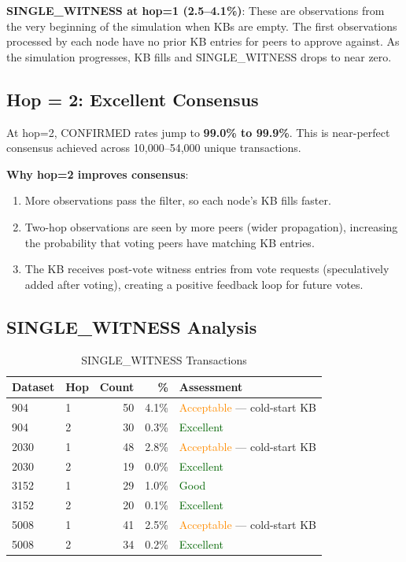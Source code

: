 \documentclass[11pt,a4paper]{article}
\begin{document}
\textbf{SINGLE\_WITNESS at hop=1 (2.5--4.1\%)}: These are observations from the
very beginning of the simulation when KBs are empty. The first observations
processed by each node have no prior KB entries for peers to approve against.
As the simulation progresses, KB fills and SINGLE\_WITNESS drops to near zero.

\subsection{Hop = 2: Excellent Consensus}

At hop=2, CONFIRMED rates jump to \textbf{99.0\% to 99.9\%}. This is near-perfect
consensus achieved across 10,000--54,000 unique transactions.

\textbf{Why hop=2 improves consensus}:
\begin{enumerate}
    \item More observations pass the filter, so each node's KB fills faster.
    \item Two-hop observations are seen by more peers (wider propagation), increasing
          the probability that voting peers have matching KB entries.
    \item The KB receives post-vote witness entries from vote requests (speculatively
          added after voting), creating a positive feedback loop for future votes.
\end{enumerate}

\subsection{SINGLE\_WITNESS Analysis}

\begin{table}[H]
\centering
\caption{SINGLE\_WITNESS Transactions}
\begin{tabular}{llrrl}
\toprule
\textbf{Dataset} & \textbf{Hop} & \textbf{Count} & \textbf{\%} & \textbf{Assessment} \\
\midrule
904   & 1 & 50 & 4.1\% & \textcolor{darkorange}{Acceptable} --- cold-start KB \\
904   & 2 & 30 & 0.3\% & \textcolor{darkgreen}{Excellent} \\
2030  & 1 & 48 & 2.8\% & \textcolor{darkorange}{Acceptable} --- cold-start KB \\
2030  & 2 & 19 & 0.0\% & \textcolor{darkgreen}{Excellent} \\
3152  & 1 & 29 & 1.0\% & \textcolor{darkgreen}{Good} \\
3152  & 2 & 20 & 0.1\% & \textcolor{darkgreen}{Excellent} \\
5008  & 1 & 41 & 2.5\% & \textcolor{darkorange}{Acceptable} --- cold-start KB \\
5008  & 2 & 34 & 0.2\% & \textcolor{darkgreen}{Excellent} \\
\bottomrule
\end{tabular}
\end{table}
\end{document}
